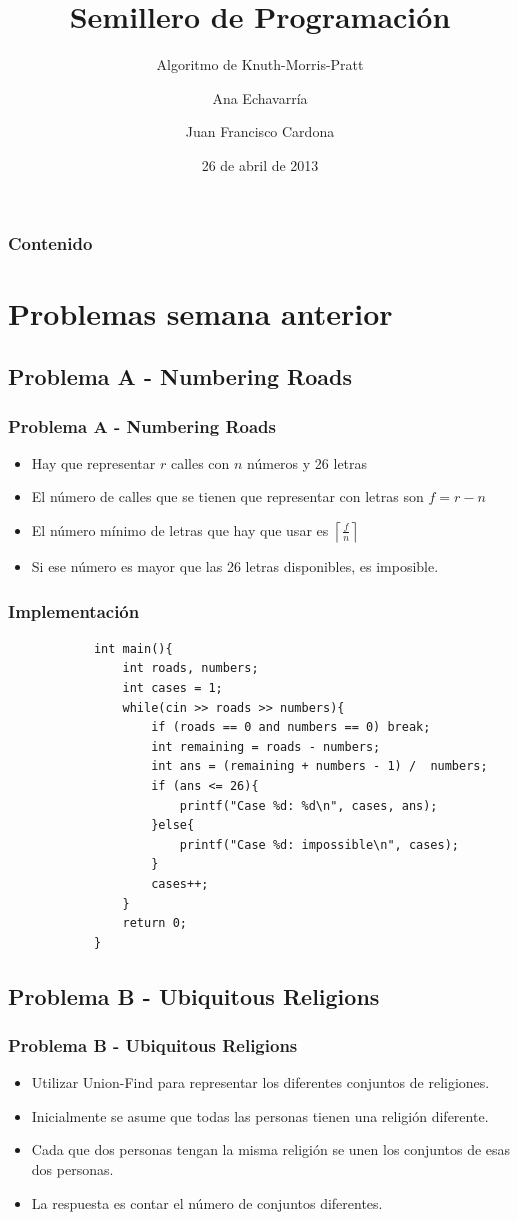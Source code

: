 \documentclass{beamer}
\title{Semillero de Programación}
\subtitle{Algoritmo de Knuth-Morris-Pratt}
\author{Ana Echavarría \and Juan Francisco Cardona}
\institute{Universidad EAFIT}
\date{26 de abril de 2013}
\begin{document}
\begin{frame}
	\titlepage
\end{frame}

\begin{frame}
	\frametitle{Contenido}
	\tableofcontents
\end{frame}

\section{Problemas semana anterior}
	\subsection{Problema A - Numbering Roads}
	
	\begin{frame}
		\frametitle{Problema A - Numbering Roads}
		\begin{itemize}
			\item Hay que representar $r$ calles con $n$ números y 26 letras
			\item El número de calles que se tienen que representar con letras son $f = r - n$
			\item El número mínimo de letras que hay que usar es $\left\lceil \frac{f}{n} \right\rceil$
			\item Si ese número es mayor que las 26 letras disponibles, es imposible.
		\end{itemize}
	\end{frame}
	
	\begin{frame}[fragile]
		\frametitle{Implementación}
		\begin{lstlisting}
			int main(){
			    int roads, numbers;
			    int cases = 1;
			    while(cin >> roads >> numbers){
			        if (roads == 0 and numbers == 0) break;
			        int remaining = roads - numbers;
			        int ans = (remaining + numbers - 1) /  numbers;
			        if (ans <= 26){
			            printf("Case %d: %d\n", cases, ans); 
			        }else{
			            printf("Case %d: impossible\n", cases); 
			        }
			        cases++;
			    }
			    return 0;
			}
		\end{lstlisting}
	\end{frame}
	
	\subsection{Problema B - Ubiquitous Religions}
	\begin{frame}
		\frametitle{Problema B - Ubiquitous Religions}
		\begin{itemize}
			\item Utilizar Union-Find para representar los diferentes conjuntos de religiones.
			\item Inicialmente se asume que todas las personas tienen una religión diferente.
			\item Cada que dos personas tengan la misma religión se unen los conjuntos de esas dos personas.
			\item La respuesta es contar el número de conjuntos diferentes.
		\end{itemize}
	\end{frame}
	
\end{document}
